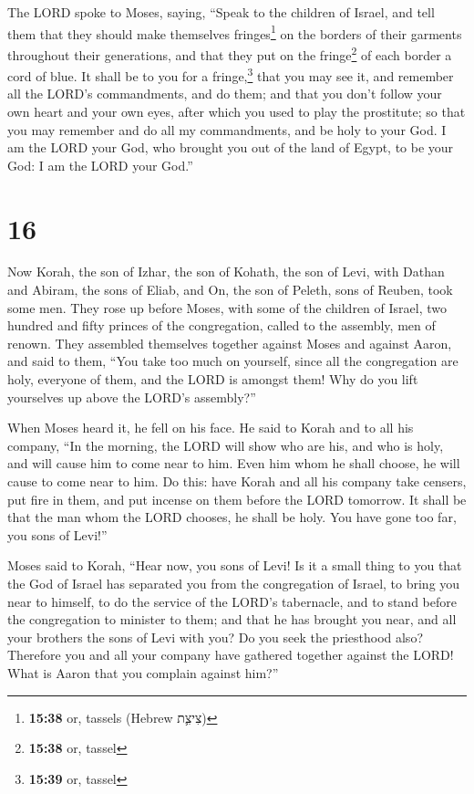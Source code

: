  The LORD spoke to Moses, saying,  ``Speak
to the children of Israel, and tell them that they should make
themselves fringes\footnote{\textbf{15:38} or, tassels (Hebrew צִיצִ֛ת)}
on the borders of their garments throughout their generations, and that
they put on the fringe\footnote{\textbf{15:38} or, tassel} of each
border a cord of blue.  It shall be to you for a
fringe,\footnote{\textbf{15:39} or, tassel} that you may see it, and
remember all the LORD's commandments, and do them; and that you don't
follow your own heart and your own eyes, after which you used to play
the prostitute;  so that you may remember and do all my
commandments, and be holy to your God.  I am the LORD
your God, who brought you out of the land of Egypt, to be your God: I am
the LORD your God.''

\hypertarget{section-15}{%
\section{16}\label{section-15}}

 Now Korah, the son of Izhar, the son of Kohath, the son
of Levi, with Dathan and Abiram, the sons of Eliab, and On, the son of
Peleth, sons of Reuben, took some men.  They rose up
before Moses, with some of the children of Israel, two hundred and fifty
princes of the congregation, called to the assembly, men of renown.
 They assembled themselves together against Moses and
against Aaron, and said to them, ``You take too much on yourself, since
all the congregation are holy, everyone of them, and the LORD is amongst
them! Why do you lift yourselves up above the LORD's assembly?''

 When Moses heard it, he fell on his face. 
He said to Korah and to all his company, ``In the morning, the LORD will
show who are his, and who is holy, and will cause him to come near to
him. Even him whom he shall choose, he will cause to come near to him.
 Do this: have Korah and all his company take censers,
 put fire in them, and put incense on them before the LORD
tomorrow. It shall be that the man whom the LORD chooses, he shall be
holy. You have gone too far, you sons of Levi!''

 Moses said to Korah, ``Hear now, you sons of Levi!
 Is it a small thing to you that the God of Israel has
separated you from the congregation of Israel, to bring you near to
himself, to do the service of the LORD's tabernacle, and to stand before
the congregation to minister to them;  and that he has
brought you near, and all your brothers the sons of Levi with you? Do
you seek the priesthood also?  Therefore you and all your
company have gathered together against the LORD! What is Aaron that you
complain against him?''

